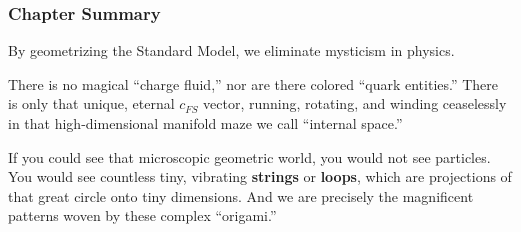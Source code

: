 \subsubsection{Chapter Summary}

By geometrizing the Standard Model, we eliminate mysticism in physics.

There is no magical ``charge fluid,'' nor are there colored ``quark entities.'' There is only that unique, eternal $c_{FS}$ vector, running, rotating, and winding ceaselessly in that high-dimensional manifold maze we call ``internal space.''

If you could see that microscopic geometric world, you would not see particles. You would see countless tiny, vibrating \textbf{strings} or \textbf{loops}, which are projections of that great circle onto tiny dimensions. And we are precisely the magnificent patterns woven by these complex ``origami.''

